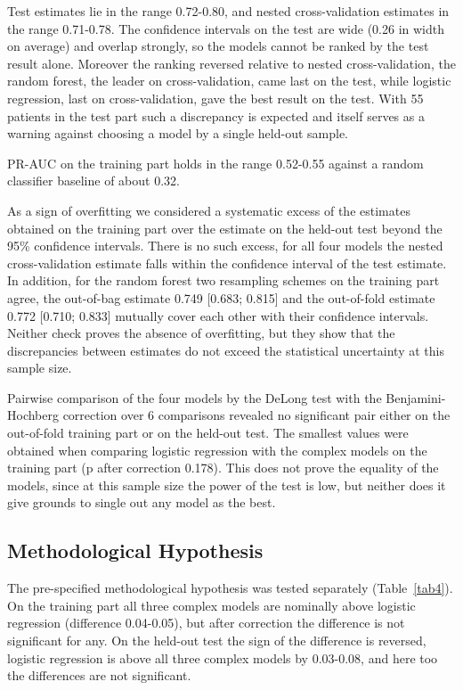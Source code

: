 \documentclass[pdflatex,sn-basic,Numbered]{sn-jnl}
\begin{document}
Test estimates lie in the range 0.72-0.80, and nested cross-validation estimates in the range 0.71-0.78. The confidence intervals on the test are wide (0.26 in width on average) and overlap strongly, so the models cannot be ranked by the test result alone. Moreover the ranking reversed relative to nested cross-validation, the random forest, the leader on cross-validation, came last on the test, while logistic regression, last on cross-validation, gave the best result on the test. With 55 patients in the test part such a discrepancy is expected and itself serves as a warning against choosing a model by a single held-out sample.

PR-AUC on the training part holds in the range 0.52-0.55 against a random classifier baseline of about 0.32.

As a sign of overfitting we considered a systematic excess of the estimates obtained on the training part over the estimate on the held-out test beyond the 95\% confidence intervals. There is no such excess, for all four models the nested cross-validation estimate falls within the confidence interval of the test estimate. In addition, for the random forest two resampling schemes on the training part agree, the out-of-bag estimate 0.749 [0.683; 0.815] and the out-of-fold estimate 0.772 [0.710; 0.833] mutually cover each other with their confidence intervals. Neither check proves the absence of overfitting, but they show that the discrepancies between estimates do not exceed the statistical uncertainty at this sample size.

Pairwise comparison of the four models by the DeLong test with the Benjamini-Hochberg correction over 6 comparisons revealed no significant pair either on the out-of-fold training part or on the held-out test. The smallest values were obtained when comparing logistic regression with the complex models on the training part (p after correction 0.178). This does not prove the equality of the models, since at this sample size the power of the test is low, but neither does it give grounds to single out any model as the best.

\subsection{Methodological Hypothesis}\label{subsec3_4}

The pre-specified methodological hypothesis was tested separately (Table~\ref{tab4}). On the training part all three complex models are nominally above logistic regression (difference 0.04-0.05), but after correction the difference is not significant for any. On the held-out test the sign of the difference is reversed, logistic regression is above all three complex models by 0.03-0.08, and here too the differences are not significant.
\end{document}
